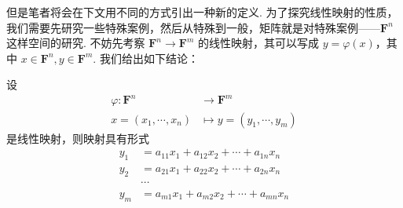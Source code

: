 但是笔者将会在下文用不同的方式引出一种新的定义. 为了探究线性映射的性质，我们需要先研究一些特殊案例，然后从特殊到一般，矩阵就是对特殊案例——$\mathbf{F}^n$ 这样空间的研究. 不妨先考察 $\mathbf{F}^n\to\mathbf{F}^m$ 的线性映射，其可以写成 $y = \varphi(x)$，其中 $x\in\mathbf{F}^n, y\in\mathbf{F}^m$. 我们给出如下结论：
\begin{lemma}{}{}
    设
    \begin{align*}
        \varphi \colon \mathbf{F}^n &\to \mathbf{F}^m \\
        x = (x_1, \cdots, x_n) & \mapsto y = (y_1, \cdots, y_m)
    \end{align*}
    是线性映射，则映射具有形式
    \begin{align*}
        y_1 &= a_{11} x_1 + a_{12} x_2 + \cdots + a_{1n} x_n \\
        y_2 &= a_{21} x_1 + a_{22} x_2 + \cdots + a_{2n} x_n \\
        & \cdots\\
        y_m &= a_{m1} x_1 + a_{m2} x_2 + \cdots + a_{mn} x_n
    \end{align*}
\end{lemma}
